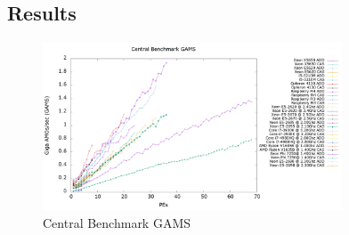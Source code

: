 
\subsection{Results}
\label{subsec:results}

\begin{figure}[!t]
\centering
\includegraphics[width=3.5in]{figures/CENTRAL_GAMS.png}
\caption{Central Benchmark GAMS}
\label{fig:central_gams}
\end{figure}

